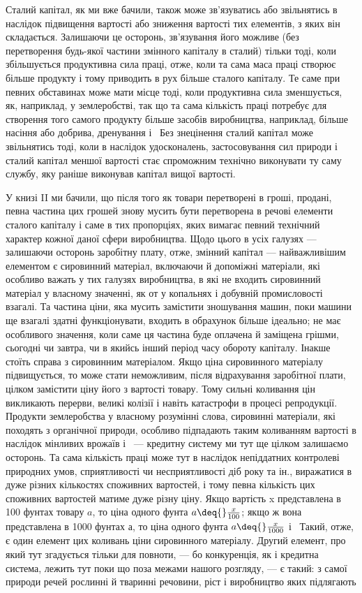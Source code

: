 Сталий капітал, як ми вже бачили, також може зв’язуватись
або звільнятись в наслідок підвищення вартості або зниження
вартості тих елементів, з яких він складається. Залишаючи це
осторонь, зв’язування його можливе (без перетворення будь-якої
частини змінного капіталу в сталий) тільки тоді, коли збільшується
продуктивна сила праці, отже, коли та сама маса праці
створює більше продукту і тому приводить в рух більше сталого капіталу. Те саме при певних
обставинах може мати місце
тоді, коли продуктивна сила зменшується, як, наприклад, у землеробстві, так що та сама кількість
праці потребує для створення
того самого продукту більше засобів виробництва, наприклад,
більше насіння або добрива, дренування і~ Без знецінення
сталий капітал може звільнятись тоді, коли в наслідок удосконалень, застосовування сил природи і~ сталий капітал меншої вартості стає спроможним технічно виконувати ту саму службу, яку раніше
виконував капітал вищої вартості.

У книзі II ми бачили, що після того як товари перетворені
в гроші, продані, певна частина цих грошей знову мусить бути
перетворена в речові елементи сталого капіталу і саме в тих
пропорціях, яких вимагає певний технічний характер кожної
даної сфери виробництва. Щодо цього в усіх галузях — залишаючи осторонь заробітну плату, отже,
змінний капітал — найважливішим елементом є сировинний матеріал, включаючи й допоміжні матеріали,
які особливо важать у тих галузях виробництва, в які не входить сировинний матеріал у власному
значенні, як от у копальнях і добувній промисловості взагалі. Та частина ціни, яка мусить замістити
зношування машин, поки
машини ще взагалі здатні функціонувати, входить в обрахунок
більше ідеально; не має особливого значення, коли саме ця
частина буде оплачена й заміщена грішми, сьогодні чи завтра,
чи в якийсь інший період часу обороту капіталу. Інакше стоїть
справа з сировинним матеріалом. Якщо ціна сировинного матеріалу підвищується, то може стати
неможливим, після відрахування заробітної плати, цілком замістити ціну його з вартості товару. Тому
сильні коливання цін викликають перерви, великі
колізії і навіть катастрофи в процесі репродукції. Продукти
землеробства у власному розумінні слова, сировинні матеріали,
які походять з органічної природи, особливо підпадають таким
коливанням вартості в наслідок мінливих врожаїв і~ — кредитну систему ми тут ще цілком
залишаємо осторонь. Та сама
кількість праці може тут в наслідок непіддатних контролеві природних умов, сприятливості чи
несприятливості діб року та ін.,
виражатися в дуже різних кількостях споживних вартостей,
і тому певна кількість цих споживних вартостей матиме дуже
різну ціну. Якщо вартість x представлена в 100 фунтах товару $a$, то ціна одного фунта $a \deq{} \frac{x}{100}$; якщо
ж вона представлена в 1000 фунтах $а$, то ціна одного фунта $a \deq{} \frac{x}{1000}$ і~ Такий, отже, є один
елемент цих коливань ціни сировинного матеріалу.
Другий елемент, про який тут згадується тільки для повноти, — бо конкуренція, як і кредитна система,
лежить тут поки що поза
межами нашого розгляду, — є такий: з самої природи речей
рослинні й тваринні речовини, ріст і виробництво яких підлягають
\parbreak{}  %
